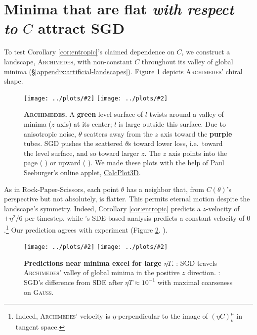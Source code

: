 \documentclass[openany, notitlepage, justified]{tufte-book}
\newcommand{\oftwo}[1]{%
    {\tiny\raisebox{0.04cm}{$%
        \ifthenelse{\equal{#1}{0}}{{\color{moor}\blacksquare}}{\square}%
        \ifthenelse{\equal{#1}{1}}{{\color{moor}\blacksquare}}{\square}%
    $}}%
}
\theoremstyle{plain}
\theoremstyle{definition}
\newcommand{\pmoo}[2]{\texttt{[image: ../plots/\#2]}}
\newcommand{\Gauss}{\textsc{Gauss}}
\newcommand{\Archimedes}{\textsc{Archimedes}}
\begin{document}
    \section{Minima that are flat \emph{with respect to} $C$ attract SGD}
        \label{subsect:entropic}
        To test Corollary \ref{cor:entropic}'s claimed dependence on $C$, we
        construct a landscape,
        \Archimedes, with non-constant $C$ throughout its valley of global
        minima (\S\ref{appendix:artificial-landscapes}).  Figure
        \ref{fig:archimedes} depicts \Archimedes' chiral shape.
        \begin{figure}
            \centering
            \pmoo{3cm}{from-above}
            \pmoo{3cm}{from-side}
            \caption{
                \textbf{\Archimedes.}
                A \textbf{green} level surface of $l$ twists around a valley of
                minima ($z$ axis) at its center; $l$ is large outside this
                surface.  Due to anisotropic noise, $\theta$ scatters away
                from the $z$ axis toward the \textbf{purple} tubes.
                SGD pushes the scattered $\theta$s toward lower loss, i.e.\
                toward the level surface, and so toward larger $z$.
                The $z$ axis points into the page (\protect\oftwo{0}) or upward
                (\protect\oftwo{1}).
                We made these plots with
                the help of Paul Seeburger's online applet,
                \href{https://www.monroecc.edu/faculty/paulseeburger/calcnsf/CalcPlot3D/}{CalcPlot3D}.
            }
            \label{fig:archimedes}
        \end{figure}
        As in Rock-Paper-Scissors, each point $\theta$ has a neighbor that,
        from $C(\theta)$'s perspective but not absolutely, is flatter.  This
        permits eternal motion despite the landscape's symmetry.
        Indeed, Corollary \ref{cor:entropic} predicts 
        a $z$-velocity of $+\eta^2/6$ per timestep, while \citep{ch18}'s
        SDE-based analysis predicts a constant velocity of $0$.\footnote{
            Indeed, \Archimedes' velocity is $\eta$-perpendicular to the image
            of $(\eta C)^\mu_\nu$ in tangent space.
        }
        Our prediction agrees with experiment (Figure
        \ref{fig:vssde}.\oftwo{0}).
        \begin{figure} 
            \centering
            \pmoo{3.75cm}{neurips-thermo-linear-screw}
            \pmoo{3.5cm}{vs-sde}
            \caption{
                \textbf{Predictions near minima excel for large $\eta T$.}
                \protect\oftwo{0}: SGD travels \Archimedes' valley of global
                minima in the positive $z$ direction.  
                \protect\oftwo{1}: SGD's difference from SDE after $\eta T
                \approx 10^{-1}$ with maximal coarseness on \Gauss.  
            }
            \label{fig:vssde}
        \end{figure}
\end{document}
